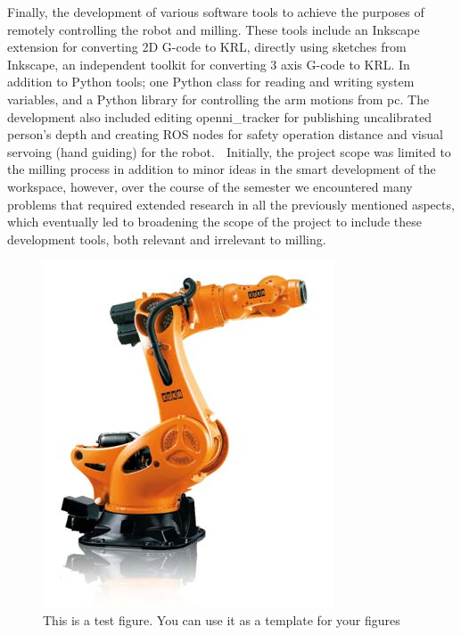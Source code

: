 Finally, the development of various software tools to achieve the purposes of remotely controlling the robot and milling. These tools include an Inkscape extension for converting 2D G-code to KRL, directly using sketches from Inkscape, an independent toolkit for converting 3 axis G-code to KRL. In addition to Python tools; one Python class for reading and writing system variables, and a Python library for controlling the arm motions from pc. The development also included editing openni\_tracker for publishing uncalibrated person's depth and creating ROS nodes for safety operation distance and visual servoing (hand guiding) for the robot.

Initially, the project scope was limited to the milling process in addition to minor ideas in the smart development of the workspace, however, over the course of the semester we encountered many problems that required extended research in all the previously mentioned aspects, which eventually led to broadening the scope of the project to include these development tools, both relevant and irrelevant to milling. 
\begin{figure}[h]
    \centering
    \includegraphics[width=0.7\linewidth]{figures/kuka}
    \caption[test Fig]{This is a test figure. You can use it as a template for your figures}
    \label{fig:kuka}
\end{figure}

